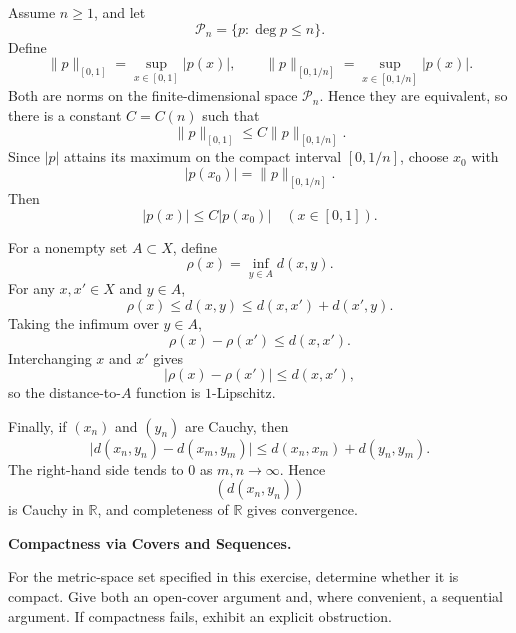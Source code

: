 \begin{solution}
Assume \(n\ge1\), and let
\[
\mathcal P_n=\{p:\deg p\le n\}.
\]
Define
\[
\|p\|_{[0,1]}
=
\sup_{x\in[0,1]}|p(x)|,
\qquad
\|p\|_{[0,1/n]}
=
\sup_{x\in[0,1/n]}|p(x)|.
\]
Both are norms on the finite-dimensional space \(\mathcal P_n\). Hence they are equivalent, so there is a constant \(C=C(n)\) such that
\[
\|p\|_{[0,1]}
\le
C\|p\|_{[0,1/n]}.
\]
Since \(|p|\) attains its maximum on the compact interval \([0,1/n]\), choose \(x_0\) with
\[
|p(x_0)|
=
\|p\|_{[0,1/n]}.
\]
Then
\[
\boxed{
|p(x)|\le C|p(x_0)|
\quad
(x\in[0,1]).
}
\]

For a nonempty set \(A\subset X\), define
\[
\rho(x)=\inf_{y\in A}d(x,y).
\]
For any \(x,x'\in X\) and \(y\in A\),
\[
\rho(x)
\le
d(x,y)
\le
d(x,x')+d(x',y).
\]
Taking the infimum over \(y\in A\),
\[
\rho(x)-\rho(x')
\le
d(x,x').
\]
Interchanging \(x\) and \(x'\) gives
\[
\boxed{
|\rho(x)-\rho(x')|
\le
d(x,x'),
}
\]
so the distance-to-\(A\) function is \(1\)-Lipschitz.

Finally, if \((x_n)\) and \((y_n)\) are Cauchy, then
\[
\bigl|
d(x_n,y_n)-d(x_m,y_m)
\bigr|
\le
d(x_n,x_m)+d(y_n,y_m).
\]
The right-hand side tends to \(0\) as \(m,n\to\infty\). Hence
\[
(d(x_n,y_n))
\]
is Cauchy in \(\mathbb R\), and completeness of \(\mathbb R\) gives convergence.
\end{solution}


\begin{problem}[CP-II-0136]
\label{prob:cp-ii-0136}
\textbf{Compactness via Covers and Sequences.}

\hspace*{1.5em}For the metric-space set specified in this exercise, determine whether it is
compact. Give both an open-cover argument and, where convenient, a sequential
argument. If compactness fails, exhibit an explicit obstruction.
\end{problem}

